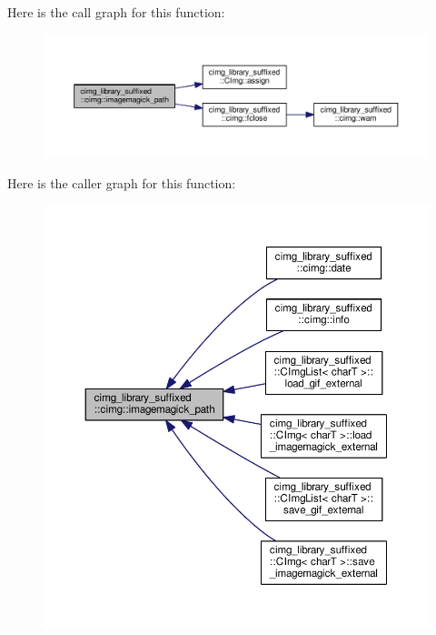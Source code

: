 Here is the call graph for this function\+:
\nopagebreak
\begin{figure}[H]
\begin{center}
\leavevmode
\includegraphics[width=350pt]{d4/d9b/namespacecimg__library__suffixed_1_1cimg_a96cabeea0a54a10aeee97ead7b672f0f_cgraph}
\end{center}
\end{figure}
Here is the caller graph for this function\+:
\nopagebreak
\begin{figure}[H]
\begin{center}
\leavevmode
\includegraphics[width=350pt]{d4/d9b/namespacecimg__library__suffixed_1_1cimg_a96cabeea0a54a10aeee97ead7b672f0f_icgraph}
\end{center}
\end{figure}
\mbox{\label{namespacecimg__library__suffixed_1_1cimg_a79b7a247520612001a04d8ef1c2991dc}} 
